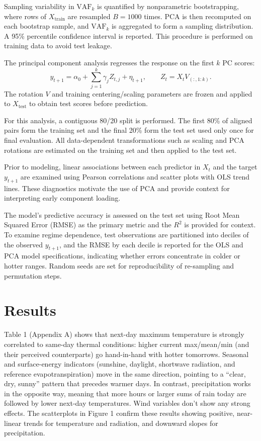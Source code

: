 \documentclass[
]{article}
\begin{document}
Sampling variability in \(\text{VAF}_k\) is quantified by nonparametric
bootstrapping, where rows of \(X_{\text{train}}\) are resampled
\(B=1000\) times. PCA is then recomputed on each bootstrap sample, and
\(\text{VAF}_k\) is aggregated to form a sampling distribution. A 95\%
percentile confidence interval is reported. This procedure is performed
on training data to avoid test leakage.

The principal component analysis regresses the response on the first
\(k\) PC scores: \[
y_{t+1}=\alpha_0+\sum_{j=1}^{k}\gamma_j Z_{t,j}+\eta_{t+1},\qquad Z_{t}=X_{t}V_{(:,1:k)}.
\] The rotation \(V\) and training centering/scaling parameters are
frozen and applied to \(X_{\text{test}}\) to obtain test scores before
prediction.

For this analysis, a contiguous 80/20 split is performed. The first 80\%
of aligned pairs form the training set and the final 20\% form the test
set used only once for final evaluation. All data-dependent
transformations such as scaling and PCA rotations are estimated on the
training set and then applied to the test set.

Prior to modeling, linear associations between each predictor in \(X_t\)
and the target \(y_{t+1}\) are examined using Pearson correlations and
scatter plots with OLS trend lines. These diagnostics motivate the use
of PCA and provide context for interpreting early component loading.

The model's predictive accuracy is assessed on the test set using Root
Mean Squared Error (RMSE) as the primary metric and the \(R^2\) is
provided for context. To examine regime dependence, test observations
are partitioned into deciles of the observed \(y_{t+1}\), and the RMSE
by each decile is reported for the OLS and PCA model specifications,
indicating whether errors concentrate in colder or hotter ranges. Random
seeds are set for reproducibility of re-sampling and permutation steps.

\section{Results}\label{results}

Table 1 (Appendix A) shows that next-day maximum temperature is strongly
correlated to same-day thermal conditions: higher current max/mean/min
(and their perceived counterparts) go hand-in-hand with hotter
tomorrows. Seasonal and surface-energy indicators (sunshine, daylight,
shortwave radiation, and reference evapotranspiration) move in the same
direction, pointing to a ``clear, dry, sunny'' pattern that precedes
warmer days. In contrast, precipitation works in the opposite way,
meaning that more hours or larger sums of rain today are followed by
lower next-day temperatures. Wind variables don't show any strong
effects. The scatterplots in Figure 1 confirm these results showing
positive, near-linear trends for temperature and radiation, and downward
slopes for precipitation.
\end{document}
